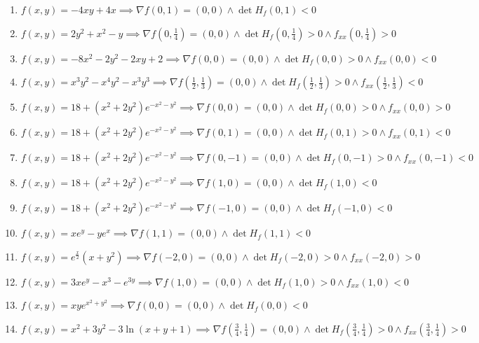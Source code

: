 \documentclass[11pt,a4paper]{article}
\begin{document}
\begin{enumerate}
\item $\displaystyle f(x, y) = -4xy + 4x \implies \nabla f(0, 1) = (0, 0) \land \det H_{f}(0, 1) < 0$
\item $\displaystyle f(x, y) = 2y^{2} + x^{2} - y \implies \nabla f\left( 0, \frac{1}{4} \right) = (0, 0) \land \det H_{f}\left( 0, \frac{1}{4} \right) > 0 \land f_{xx}\left( 0, \frac{1}{4} \right) > 0$
\item $\displaystyle f(x, y) = -8x^{2} - 2y^{2} - 2xy + 2 \implies \nabla f(0, 0) = (0, 0) \land \det H_{f}(0, 0) > 0 \land f_{xx}(0, 0) < 0$
\item $\displaystyle f(x, y) = x^{3} y^{2} - x^{4} y^{2} - x^{3} y^{3} \implies \nabla f\left( \frac{1}{2}, \frac{1}{3} \right) = (0, 0) \land \det H_{f}\left( \frac{1}{2}, \frac{1}{3} \right) > 0 \land f_{xx}\left( \frac{1}{2}, \frac{1}{3} \right) < 0$
\item $\displaystyle f(x, y) = 18 + (x^{2} + 2y^{2}) e^{-x^{2} - y^{2}} \implies \nabla f(0, 0) = (0, 0) \land \det H_{f}(0, 0) > 0 \land f_{xx}(0, 0) > 0$
\item $\displaystyle f(x, y) = 18 + (x^{2} + 2y^{2}) e^{-x^{2} - y^{2}} \implies \nabla f(0, 1) = (0, 0) \land \det H_{f}(0, 1) > 0 \land f_{xx}(0, 1) < 0$
\item $\displaystyle f(x, y) = 18 + (x^{2} + 2y^{2}) e^{-x^{2} - y^{2}} \implies \nabla f(0, -1) = (0, 0) \land \det H_{f}(0, -1) > 0 \land f_{xx}(0, -1) < 0$
\item $\displaystyle f(x, y) = 18 + (x^{2} + 2y^{2}) e^{-x^{2} - y^{2}} \implies \nabla f(1, 0) = (0, 0) \land \det H_{f}(1, 0) < 0$
\item $\displaystyle f(x, y) = 18 + (x^{2} + 2y^{2}) e^{-x^{2} - y^{2}} \implies \nabla f(-1, 0) = (0, 0) \land \det H_{f}(-1, 0) < 0$
\item $\displaystyle f(x, y) = x e^{y} - y e^{x} \implies \nabla f(1, 1) = (0, 0) \land \det H_{f}(1, 1) < 0$
\item $\displaystyle f(x, y) = e^{\frac{x}{2}} (x + y^{2}) \implies \nabla f(-2, 0) = (0, 0) \land \det H_{f}(-2, 0) > 0 \land f_{xx}(-2, 0) > 0$
\item $\displaystyle f(x, y) = 3x e^{y} - x^{3} - e^{3y} \implies \nabla f(1, 0) = (0, 0) \land \det H_{f}(1, 0) > 0 \land f_{xx}(1, 0) < 0$
\item $\displaystyle f(x, y) = xy e^{x^{2} + y^{2}} \implies \nabla f(0, 0) = (0, 0) \land \det H_{f}(0, 0) < 0$
\item $\displaystyle f(x, y) = x^{2} + 3y^{2} - 3\ln(x + y + 1) \implies \nabla f\left( \frac{3}{4}, \frac{1}{4} \right) = (0, 0) \land \det H_{f}\left( \frac{3}{4}, \frac{1}{4} \right) > 0 \land f_{xx}\left( \frac{3}{4}, \frac{1}{4} \right) > 0$

\end{enumerate}
\end{document}
